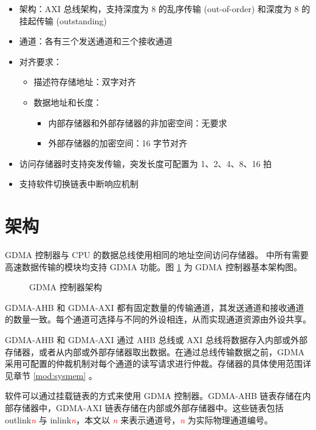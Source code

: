 \documentclass[main\_\_CN.tex]{subfiles}
\begin{document}
\begin{itemize}
    \item 架构：AXI 总线架构，支持深度为 8 的乱序传输 (out-of-order) 和深度为 8 的挂起传输 (outstanding)
    \item 通道：各有三个发送通道和三个接收通道
    \item 对齐要求：
        \begin{itemize}
            \item 描述符存储地址：双字对齐
            \item 数据地址和长度：
                \begin{itemize}
                    \item 内部存储器和外部存储器的非加密空间：无要求
                    \item 外部存储器的加密空间：16 字节对齐
                \end{itemize}
        \end{itemize}
    \item 访问存储器时支持突发传输，突发长度可配置为 1、2、4、8、16 拍
    \item 支持软件切换链表中断响应机制
\end{itemize}


\section{架构}

GDMA 控制器与 CPU 的数据总线使用相同的地址空间访问存储器。\chipname{} 中所有需要高速数据传输的模块均支持 GDMA 功能。图 \ref{fig:gdma-controller} 为 GDMA 控制器基本架构图。

\begin{figure}[H]

\centering
\caption{GDMA 控制器架构}
\label{fig:gdma-controller}
\end{figure}

GDMA-AHB 和 GDMA-AXI 都有固定数量的传输通道，其发送通道和接收通道的数量一致。每个通道可选择与不同的外设相连，从而实现通道资源由外设共享。

GDMA-AHB 和 GDMA-AXI 通过 AHB 总线或 AXI 总线将数据存入内部或外部存储器，或者从内部或外部存储器取出数据。在通过总线传输数据之前，GDMA 采用可配置的仲裁机制对每个通道的读写请求进行仲裁。存储器的具体使用范围详见章节 \ref{mod:sysmem} \textit{}。

软件可以通过挂载链表的方式来使用 GDMA 控制器。GDMA-AHB 链表存储在内部存储器中，GDMA-AXI 链表存储在内部或外部存储器中。这些链表包括 outlink\textcolor{red}{\it{n}} 与 inlink\textcolor{red}{\it{n}}，本文以 \textcolor{red}{\it{n}} 来表示通道号，\textcolor{red}{\it{n}} 为实际物理通道编号。
\end{document}

